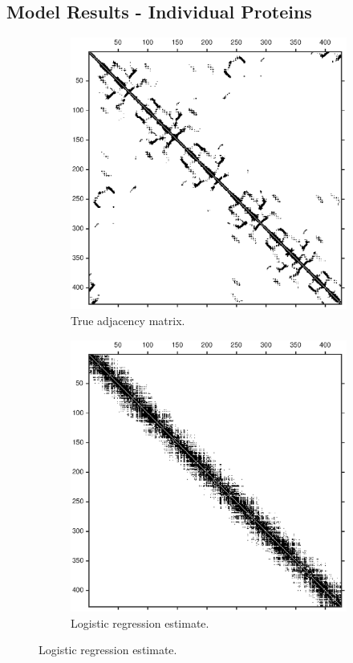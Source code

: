 \documentclass{article}
\begin{document}
\subsection{Model Results - Individual Proteins}
\begin{figure}[H]
\centering
\begin{subfigure}{0.45\textwidth}
\includegraphics[width=\linewidth]{paper_images/true_adj.eps}
\caption{True adjacency matrix.}
\label{fig:gt_adj}
\end{subfigure}
\begin{subfigure}{0.45\textwidth}
\includegraphics[width=\linewidth]{paper_images/logistic_adj.eps}
\caption{Logistic regression estimate.}
\label{fig:log_adj}
\end{subfigure}


\end{figure}
\end{document}
